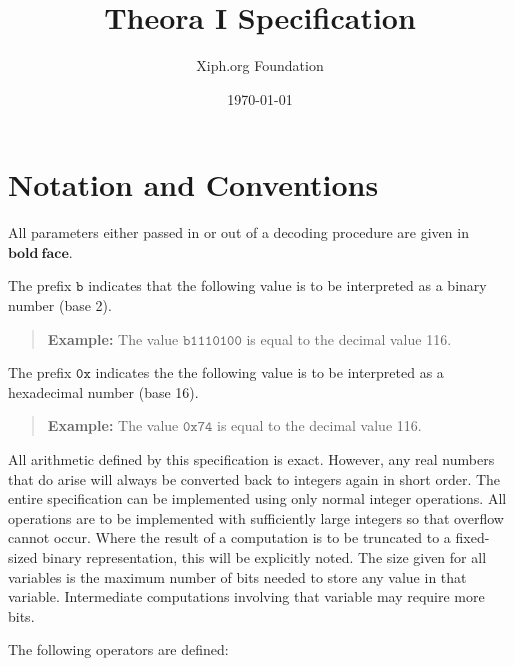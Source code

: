 \documentclass[9pt,letterpaper]{book}
\title{Theora I Specification}
\author{Xiph.org Foundation}
\date{\today}
\newcommand{\bitvar}[1]{\ensuremath{\mathbf{\bm{#1}}}}
\newcommand{\bin}[1]{\ensuremath{\mathtt{b#1}}}
\newcommand{\hex}[1]{\ensuremath{\mathtt{0x#1}}}
\numberwithin{equation}{chapter}
\numberwithin{figure}{chapter}
\numberwithin{table}{chapter}
\begin{document}
\frontmatter

\begin{titlepage}
\maketitle
\end{titlepage}
\thispagestyle{empty}
\cleardoublepage


\thispagestyle{plain}
\tableofcontents
\cleardoublepage

\thispagestyle{plain}
\listoffigures
\cleardoublepage

\thispagestyle{plain}
\listoftables
\cleardoublepage

\thispagestyle{plain}
\chapter*{Notation and Conventions}

All parameters either passed in or out of a decoding procedure are given in
 \bitvar{bold\ face}.

The prefix \bin{} indicates that the following value is to be interpreted as a
 binary number (base 2).
\begin{verse}
{\bf Example:} The value \bin{1110100} is equal to the decimal value 116.
\end{verse}

The prefix \hex{} indicates the the following value is to be interpreted as a
 hexadecimal number (base 16).
\begin{verse}
{\bf Example:} The value \hex{74} is equal to the decimal value 116.
\end{verse}

All arithmetic defined by this specification is exact.
However, any real numbers that do arise will always be converted back to
 integers again in short order.
The entire specification can be implemented using only normal integer
 operations.
All operations are to be implemented with sufficiently large integers so that
 overflow cannot occur.
Where the result of a computation is to be truncated to a fixed-sized binary
 representation, this will be explicitly noted.
The size given for all variables is the maximum number of bits needed to store
 any value in that variable.
Intermediate computations involving that variable may require more bits.

The following operators are defined:
\end{document}
